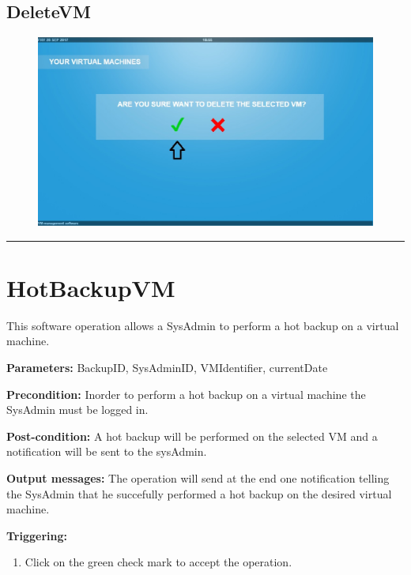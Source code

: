  
\subsection{DeleteVM}

\begin{figure}[H]
\centering
\includegraphics[width=170mm]{images/deleteVM5.eps}
\caption{\label{overflow}}
\end{figure}


\hrule
\vspace{0.5cm}









\section{HotBackupVM}
\label{operation:HotBackupVM}
This software operation allows a SysAdmin to perform a hot backup on a virtual
machine.
\begin{description}

\item \textbf{Parameters:} BackupID, SysAdminID, VMIdentifier, currentDate
\item \textbf{Precondition:} Inorder to perform a hot backup on a virtual
machine the SysAdmin must be logged in.
\item \textbf{Post-condition:} A hot backup will be performed on the selected
VM and a notification will be sent to the sysAdmin.
\item \textbf{Output messages:} The operation will send at the end one
notification telling the SysAdmin that he succefully performed a hot backup on
the desired virtual machine.

\item \textbf{Triggering:}
\begin{enumerate}
\item Click on the green check mark to accept the operation.
\end{enumerate}

 
\end{description}

